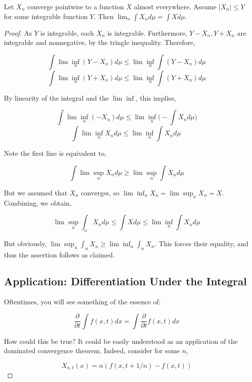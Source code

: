     \begin{theorem}
        Let $X_n$ converge pointwise to a function $X$ almost everywhere. 
        Assume $|X_n| \leq Y$ for some integrable function $Y$. Then 
        $\lim_n \int X_n d\mu = \int X d\mu$.
    \end{theorem}

    \begin{proof}
        As $Y$ is integrable, each $X_n$ is integrable. Furthermore, 
        $Y - X_n, Y + X_n$ are integrable and nonnegative, by the tringle inequality. Therefore, 

        \[  \int \lim\inf_n(Y - X_n) d\mu \leq \lim\inf_n\int(Y - X_n) d\mu \]
        \[  \int \lim\inf_n(Y + X_n) d\mu \leq \lim\inf_n \int(Y + X_n) d\mu \]

        By linearity of the integral and the $\lim\inf$, this implies,

        \[ \int \lim\inf_n (-X_n) d\mu \leq  \lim\inf_n \bigg(-\int X_nd\mu\bigg) \]
        \[ \int \lim\inf_n X_n  d\mu \leq \lim\inf_n \int X_n d\mu \ \]

        Note the first line is equivalent to, 

        \[ \int \lim\sup_n X_n d\mu \geq \lim\sup_n \int X_n d\mu  \]

        But we assumed that $X_n$ converges, so $\lim\inf_n X_n = \lim\sup_n X_n = X$. Combining, 
        we obtain, 

        \[ \lim\sup_n \int_n X_n d\mu \leq \int X d\mu \leq \lim\inf_n \int X_n d\mu \]

        But obviously, $\lim\sup_n \int_n X_n \geq \lim\inf_n \int_n X_n$. This forces their 
        equality, and thus the assertion follows as claimed.

        \subsection{Application: Differentiation Under the Integral}

        Oftentimes, you will see something of the essence of: 

        \[ \frac{\partial}{\partial t} \int f(x,t)dx =\int \frac{\partial}{\partial t}  f(x,t)dx \]

        How could this be true? It could be easily understood as an application of the dominated convergence theorem. 
        Indeed, consider for some $n$, 

        \[ X_{n,t}(x) = n(f(x,t + 1/n) - f(x,t)) \]


\end{proof}
